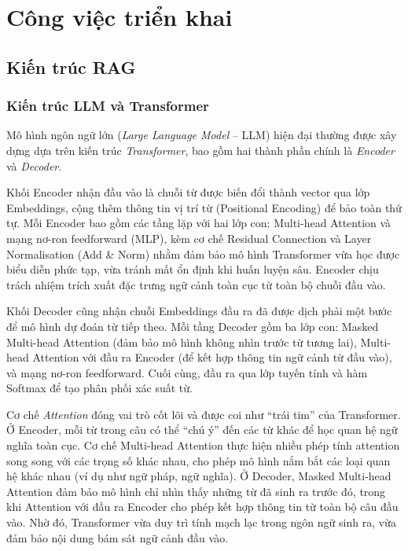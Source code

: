 \chapter{Công việc triển khai}

\section{Kiến trúc RAG}

\subsection{Kiến trúc LLM và Transformer}

{Mô hình ngôn ngữ lớn} (\emph{Large Language Model} -- LLM) hiện đại thường được xây dựng dựa trên kiến trúc \emph{Transformer}, bao gồm hai thành phần chính là \emph{Encoder} và \emph{Decoder}.

Khối {Encoder} nhận đầu vào là chuỗi từ được biến đổi thành vector qua lớp Embeddings, cộng thêm thông tin vị trí từ (Positional Encoding) để bảo toàn thứ tự. Mỗi Encoder bao gồm các tầng lặp với hai lớp con: Multi-head Attention và mạng nơ-ron feedforward (MLP), kèm cơ chế Residual Connection và Layer Normalisation (Add \& Norm) nhằm đảm bảo mô hình Transformer vừa học được biểu diễn phức tạp, vừa tránh mất ổn định khi huấn luyện sâu. Encoder chịu trách nhiệm trích xuất đặc trưng ngữ cảnh toàn cục từ toàn bộ chuỗi đầu vào.

Khối {Decoder} cũng nhận chuỗi Embeddings đầu ra đã được dịch phải một bước để mô hình dự đoán từ tiếp theo. Mỗi tầng Decoder gồm ba lớp con: Masked Multi-head Attention (đảm bảo mô hình không nhìn trước từ tương lai), Multi-head Attention với đầu ra Encoder (để kết hợp thông tin ngữ cảnh từ đầu vào), và mạng nơ-ron feedforward. Cuối cùng, đầu ra qua lớp tuyến tính và hàm Softmax để tạo phân phối xác suất từ.

Cơ chế \emph{Attention} đóng vai trò cốt lõi và được coi như ``trái tim'' của Transformer. Ở Encoder, mỗi từ trong câu có thể ``chú ý'' đến các từ khác để học quan hệ ngữ nghĩa toàn cục. Cơ chế Multi-head Attention thực hiện nhiều phép tính attention song song với các trọng số khác nhau, cho phép mô hình nắm bắt các loại quan hệ khác nhau (ví dụ như ngữ pháp, ngữ nghĩa). Ở Decoder, Masked Multi-head Attention đảm bảo mô hình chỉ nhìn thấy những từ đã sinh ra trước đó, trong khi Attention với đầu ra Encoder cho phép kết hợp thông tin từ toàn bộ câu đầu vào. Nhờ đó, Transformer vừa duy trì tính mạch lạc trong ngôn ngữ sinh ra, vừa đảm bảo nội dung bám sát ngữ cảnh đầu vào. 

